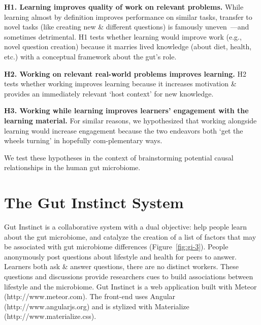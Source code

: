 \textbf{H1. Learning improves quality of work on relevant problems.}
While learning almost by definition improves performance on similar tasks, transfer to novel tasks (like creating new \& different questions) is famously uneven~\cite{Boden2004}---and sometimes detrimental. H1 tests whether learning would improve work (e.g., novel question creation) because it marries lived knowledge (about diet, health, etc.) with a conceptual framework about the gut’s role.

\textbf{H2. Working on relevant real-world problems improves learning.}
H2 tests whether working improves learning because it increases motivation \& provides an immediately relevant ‘host context’ for new knowledge.
 
\textbf{H3. Working while learning improves learners’ engagement with the learning material.} 
For similar reasons, we hypothesized that working alongside learning would increase engagement because the two endeavors both ‘get the wheels turning’ in hopefully com-plementary ways.

We test these hypotheses in the context of brainstorming potential causal relationships in the human gut microbiome. 

\section{The Gut Instinct System}
Gut Instinct is a collaborative system with a dual objective: help people learn about the gut microbiome, and catalyze the creation of a list of factors that may be associated with gut microbiome differences (Figure~\ref{fig:gi-3}). People anonymously post questions about lifestyle and health for peers to answer. Learners both ask \& answer questions, there are
no distinct workers. These questions and discussions provide researchers cues to build associations between lifestyle and the microbiome.
Gut Instinct is a web application built with Meteor (http://www.meteor.com). The front-end uses Angular (http://www.angularjs.org) and is stylized with Materialize (http://www.materialize.css).

